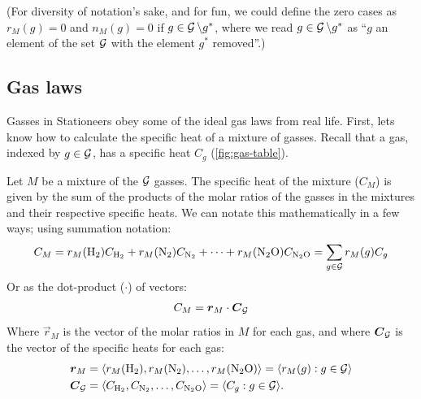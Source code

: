 \documentclass{article}
\newcommand{\Hyd}{\mathrm{H}_2}
\newcommand{\Nit}{\mathrm{N}_2}
\newcommand{\NiOx}{\mathrm{N}_2\mathrm{O}}
\begin{document}
(For diversity of notation's sake, and for fun, we could define the zero cases as $r_M(g)=0$ and
$n_M(g)=0$ if $g\in\operatorname{{\mathcal{G}}}\setminus g^*$, where we read $g\in\operatorname{{\mathcal{G}}}\setminus g^*$ as ``$g$ an element
of the set $\operatorname{{\mathcal{G}}}$ with the element $g^*$ removed''.)

\subsection{Gas laws}

Gasses in Stationeers obey some of the ideal gas laws from real life.
First, lets know how to calculate the specific heat of a mixture of gasses.
Recall that a gas, indexed by $g\in\operatorname{{\mathcal{G}}}$, has a specific heat $C_g$ (\cref{fig:gas-table}).
\begin{definition}
    Let $M$ be a mixture of the $\operatorname{{\mathcal{G}}}$ gasses. The specific heat of the mixture ($C_M$) is given by
    the sum of the products of the molar ratios of the gasses in the mixtures and their respective
    specific heats. We can notate this mathematically in a few ways; using summation notation:
    \[
        C_M
        = r_M(\Hyd)C_{\Hyd}
        + r_M(\Nit)C_{\Nit}
        + \cdots
        + r_M(\NiOx)C_{\NiOx}
        = \sum_{g\in\calG} r_M(g)C_g
    \]
    Or as the dot-product ($\cdot$) of vectors:
    \begin{equation}
        C_M = \boldsymbol{r}_M \cdot \boldsymbol{C}_{\operatorname{{\mathcal{G}}}}
    \end{equation}
    Where $\vec{r}_M$ is the vector of the molar ratios in $M$ for each gas, and
    where $\boldsymbol{C}_{\operatorname{{\mathcal{G}}}}$ is the vector of the specific heats for each gas:
    \begin{align*}
        \vec{r}_M
        &= \angvec{r_M(\Hyd),r_M(\Nit),\ldots,r_M(\NiOx)}
        = \angvec{r_M(g):g\in\calG} \\
        \vec{C}_{\calG}
        &= \angvec{C_{\Hyd},C_{\Nit},\ldots,C_{\NiOx}}
        = \angvec{C_g:g\in\calG}.
    \end{align*}
\end{definition}
\end{document}
